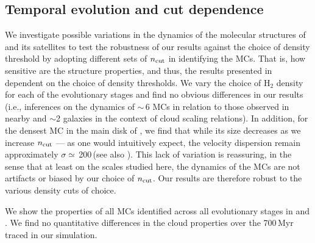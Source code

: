 \IfFileExists{emulateapjlegacy.cls}{\documentclass[iop]{emulateapjlegacy}}{\documentclass[iop]{emulateapj}}
\begin{document}
\subsection{Temporal evolution and cut dependence}\label{sec:ncut}
We investigate possible variations in the dynamics of the molecular structures of \flower and its satellites to test the robustness of our results against the choice of density threshold by adopting
different sets of $n_{\rm cut}$ in identifying the MCs.
%
That is, how sensitive are the structure properties, and thus, the results presented in  dependent on the choice of density thresholds. We vary the choice of H$_2$ density for each of the evolutionary stages and find no obvious differences in our results (i.e., inferences on the dynamics of \z$\sim$\,6 MCs in relation to those observed in nearby and \z$\sim$2 galaxies in the context of
cloud scaling relations).
%
In addition, for the densest MC in the main disk of \flower, we find that while its size decreases as we increase $n_{\rm cut}$ --- as one would intuitively expect, the velocity dispersion remain approximately $\sigma\simeq$\,200\,\kms (see also ).
%
This lack of variation is reassuring, in the sense that at least on the scales studied here, the dynamics of the MCs are not artifacts or biased by our choice of $n_{\rm cut}$. Our results are therefore robust to the various density cuts of choice.

We show the properties of all MCs identified across all evolutionary stages in  and . We find no quantitative differences in the cloud properties over the 700\,Myr traced in our simulation.
\end{document}
